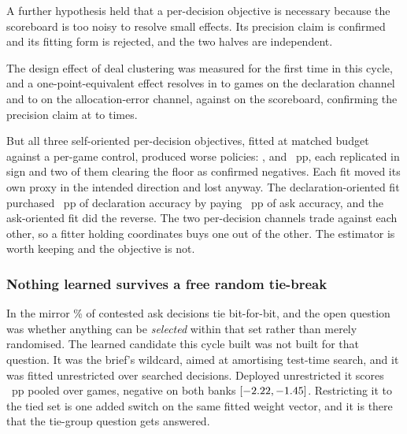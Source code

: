 A further hypothesis held that a per-decision objective is necessary because the scoreboard is too
noisy to resolve small effects. Its precision claim is confirmed and its fitting form is rejected,
and the two halves are independent.

The design effect of deal clustering was measured for the first time in this cycle, and a
one-point-equivalent effect resolves in \vsevenPerDecisionGamesLo{} to \vsevenPerDecisionGamesHi{}
games on the declaration channel and \vsevenAllocGamesLo{} to \vsevenAllocGamesHi{} on the
allocation-error channel, against \vsevenScoreboardGames{} on the scoreboard, confirming the
precision claim at \vsevenDesignEffectLo{} to \vsevenDesignEffectHi{} times.

But all three self-oriented per-decision objectives, fitted at matched budget against a per-game
control, produced worse policies: \vsevenKfourSelfDecl{}, \vsevenKfourSelfAsk{} and
\vsevenKfourSelfAlloc{}~pp, each replicated in sign and two of them clearing the floor as confirmed
negatives. Each fit moved its own proxy in the intended direction and lost anyway. The
declaration-oriented fit purchased \vsevenKfourTradeGain{}~pp of declaration accuracy by paying
\vsevenKfourTradeCost{}~pp of ask accuracy, and the ask-oriented fit did the reverse. The two
per-decision channels trade against each other, so a fitter holding \vsevenCoordinates{} coordinates
buys one out of the other. The estimator is worth keeping and the objective is not.

\subsubsection{Nothing learned survives a free random tie-break}
\label{sec:development-tie}

In the \vsix{} mirror \vsevenTieContested\% of contested ask decisions tie bit-for-bit, and the
open question was whether anything can be \emph{selected} within that set rather than merely
randomised. The learned candidate this cycle built was not built for that question. It was the
brief's wildcard, aimed at amortising test-time search, and it was fitted unrestricted over
\vsevenKfiveFitDecisions{} searched decisions. Deployed unrestricted it scores
\vsevenKfiveUnrestricted{}~pp pooled over \vsevenPhaseThreeCell{} games, negative on both banks
$[-2.22, -1.45]$. Restricting it to the tied set is one
added switch on the same fitted weight vector, and it is there that the tie-group question gets
answered.


